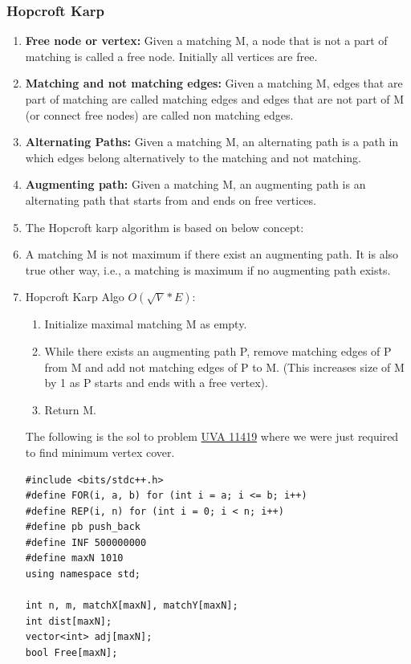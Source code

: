 \documentclass[8pt, a4paper, oneside, twocolumn]{extarticle}
\begin{document}
\subsubsection{Hopcroft Karp}
\begin{enumerate}
    \item \textbf{Free node or vertex: }Given a matching M, a node that is not a part of matching is called a free node. Initially all vertices are free.
    \item \textbf{Matching and not matching edges: }Given a matching M, edges that are part of matching are called matching edges and edges that are not part of M (or connect free nodes) are called non matching edges.
    \item \textbf{Alternating Paths: }Given a matching M, an alternating path is a path in which edges belong alternatively to the matching and not matching.
    \item \textbf{Augmenting path: }Given a matching M, an augmenting path is an alternating path that starts from and ends on free vertices.
    \item The Hopcroft karp algorithm is based on below concept:
    \item A matching M is not maximum if there exist an augmenting path. It is also true other way, i.e., a matching is maximum if no augmenting path exists.
    \item Hopcroft Karp Algo $O(\sqrt{V}*E)$: 
    \begin{enumerate}
        \item Initialize maximal matching M as empty.
        \item While there exists an augmenting path P, remove matching edges of P from M and add not matching edges of P to M. (This increases size of M by 1 as P starts and ends with a free vertex).
        \item Return M.
    \end{enumerate}
The following is the sol to problem \href {https://uva.onlinejudge.org/external/114/11419.pdf}{UVA 11419} where we were just required to find minimum vertex cover.
    \begin{verbatim}
#include <bits/stdc++.h>
#define FOR(i, a, b) for (int i = a; i <= b; i++)
#define REP(i, n) for (int i = 0; i < n; i++)
#define pb push_back
#define INF 500000000
#define maxN 1010
using namespace std;

int n, m, matchX[maxN], matchY[maxN];
int dist[maxN];
vector<int> adj[maxN];
bool Free[maxN];


\end{verbatim}
\end{enumerate}
\end{document}
